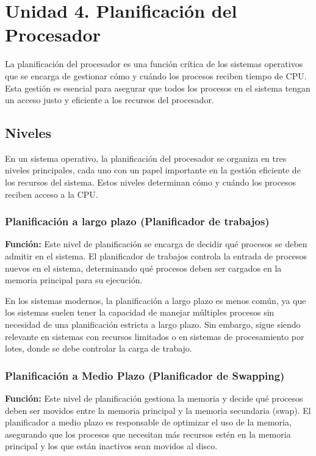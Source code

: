 \chapter{Unidad 4. Planificación del Procesador}

La planificación del procesador es una función crítica de los sistemas operativos que se encarga de gestionar cómo y cuándo los procesos reciben tiempo de CPU. Esta gestión es esencial para asegurar que todos los procesos en el sistema tengan un acceso justo y eficiente a los recursos del procesador.

\section{Niveles}
En un sistema operativo, la planificación del procesador se organiza en tres niveles principales, cada uno con un papel importante en la gestión eficiente de los recursos del sistema. Estos niveles determinan cómo y cuándo los procesos reciben acceso a la CPU.

\subsection{Planificación a largo plazo (Planificador de trabajos)}

\textbf{Función: }Este nivel de planificación se encarga de decidir qué procesos se deben admitir en el sistema. El planificador de trabajos controla la entrada de procesos nuevos en el sistema, determinando qué procesos deben ser cargados en la memoria principal para su ejecución.

En los sistemas modernos, la planificación a largo plazo es menos común, ya que los sistemas suelen tener la capacidad de manejar múltiples procesos sin necesidad de una planificación estricta a largo plazo. Sin embargo, sigue siendo relevante en sistemas con recursos limitados o en sistemas de procesamiento por lotes, donde se debe controlar la carga de trabajo.

\subsection{Planificación a Medio Plazo (Planificador de Swapping)}
\textbf{Función: }Este nivel de planificación gestiona la memoria y decide qué procesos deben ser movidos entre la memoria principal y la memoria secundaria (swap). El planificador a medio plazo es responsable de optimizar el uso de la memoria, asegurando que los procesos que necesitan más recursos estén en la memoria principal y los que están inactivos sean movidos al disco.

